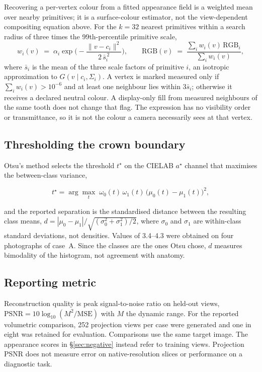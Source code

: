 \documentclass[11pt,a4paper]{article}
\begin{document}
Recovering a per-vertex colour from a fitted appearance field is a weighted mean over
nearby primitives; it is a surface-colour estimator, not the view-dependent compositing
equation above. For the $k = 32$ nearest primitives within a search radius of three times
the 99th-percentile primitive scale,
\[
  w_i(v) \;=\; \alpha_i \exp\!\Big(-\frac{\lVert v-c_i\rVert^2}{2\,\bar s_i^{\,2}}\Big),
  \qquad
  \mathrm{RGB}(v) \;=\; \frac{\sum_i w_i(v)\, \mathrm{RGB}_i}{\sum_i w_i(v)} ,
\]
where $\bar s_i$ is the mean of the three scale factors of primitive $i$, an isotropic
approximation to $G(v\mid c_i,\Sigma_i)$. A vertex is marked measured only if
$\sum_i w_i(v) > 10^{-6}$ and at least one neighbour lies within $3\bar s_i$; otherwise it
receives a declared neutral colour. A display-only fill from measured neighbours of the same
tooth does not change that flag. The expression has no visibility order or transmittance,
so it is not the colour a camera necessarily sees at that vertex.

\subsection{Thresholding the crown boundary}\label{app:otsu}

Otsu's method \cite{otsu1979} selects the threshold $t^\star$ on the CIELAB $a^\star$ channel that maximises
the between-class variance,

\[
  t^\star = \arg\max_t \; \omega_0(t)\,\omega_1(t)\,\big(\mu_0(t) - \mu_1(t)\big)^2 ,
\]

and the reported separation is the standardised distance between the resulting class
means, $d = |\mu_0 - \mu_1| / \sqrt{(\sigma_0^2 + \sigma_1^2)/2}$, where $\sigma_0$ and
$\sigma_1$ are within-class standard deviations, not densities. Values of 3.4--4.3 were
obtained on four photographs of case~A. Since the classes are the ones Otsu chose, $d$
measures bimodality of the histogram, not agreement with anatomy.

\subsection{Reporting metric}

Reconstruction quality is peak signal-to-noise ratio on held-out views,
$\mathrm{PSNR} = 10 \log_{10} (M^2 / \mathrm{MSE})$ with $M$ the dynamic range. For the reported volumetric comparison, 252 projection views per case were generated
and one in eight was retained for evaluation. Comparisons use the same target image.
The appearance scores in \S\ref{sec:negative} instead refer to training views. Projection
PSNR does not measure error on native-resolution slices or performance on a diagnostic task.
\end{document}
